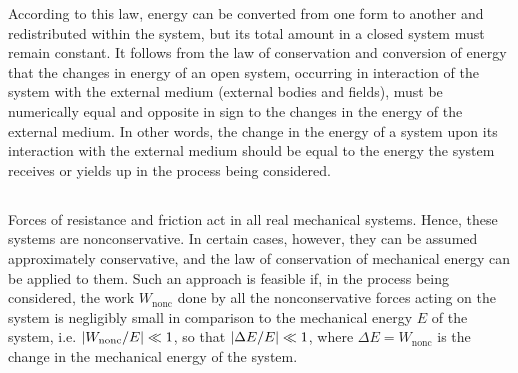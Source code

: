 According to this law, energy can be converted from one form to another and redistributed within the system, but its total amount in a closed system must remain constant. It follows from the law of conservation and conversion of energy that the changes in energy of an open system, occurring in interaction of the system with the external medium (external bodies and fields), must be numerically equal and opposite in sign to the changes in the energy of the external medium. In other words, the change in the energy of a system upon its interaction with the external medium should be equal to the energy the system receives or yields up in the process being considered.

\subsection{}\label{3.4.4} Forces of resistance and friction act in all real mechanical systems. Hence, these systems are nonconservative. In certain cases, however, they can be assumed approximately conserva­tive, and the law of conservation of mechanical energy can be applied to them. Such an approach is feasible if, in the process being considered, the work $W_{\textrm{nonc}}$ done by all the nonconserva­tive forces acting on the system is negligibly small in compari­son to the mechanical energy $E$ of the system, i.e. $\abs{W_{\textrm{nonc}}/E} \ll 1$, so that $\abs{\Delta E/E} \ll 1$, where $\Delta E = W_{\textrm{nonc}}$ is the change in the mechanical energy of the system.

